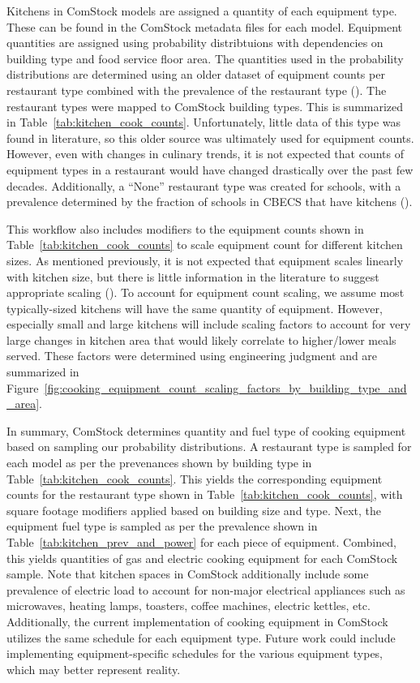 

Kitchens in ComStock models are assigned a quantity of each equipment type. These can be found in the ComStock metadata files for each model. Equipment quantities are assigned using probability distribtuions with dependencies on building type and food service floor area. The quantities used in the probability distributions are determined using an older dataset of equipment counts per restaurant type combined with the prevalence of the restaurant type (\cite{com_food_service_equip}). The restaurant types were mapped to ComStock building types. This is summarized in Table~\ref{tab:kitchen_cook_counts}. Unfortunately, little data of this type was found in literature, so this older source was ultimately used for equipment counts. However, even with changes in culinary trends, it is not expected that counts of equipment types in a restaurant would have changed drastically over the past few decades. Additionally, a “None” restaurant type was created for schools, with a prevalence determined by the fraction of schools in CBECS that have kitchens (\cite{eia2012cbecs}).

This workflow also includes modifiers to the equipment counts shown in Table~\ref{tab:kitchen_cook_counts} to scale equipment count for different kitchen sizes. As mentioned previously, it is not expected that equipment scales linearly with kitchen size, but there is little information in the literature to suggest appropriate scaling (\cite{qsr_50pct_svs}). To account for equipment count scaling, we assume most typically-sized kitchens will have the same quantity of equipment. However, especially small and large kitchens will include scaling factors to account for very large changes in kitchen area that would likely correlate to higher/lower meals served. These factors were determined using engineering judgment and are summarized in Figure~\ref{fig:cooking_equipment_count_scaling_factors_by_building_type_and_area}.

In summary, ComStock determines quantity and fuel type of cooking equipment based on sampling our probability distributions. A restaurant type is sampled for each model as per the prevenances shown by building type in Table~\ref{tab:kitchen_cook_counts}. This yields the corresponding equipment counts for the restaurant type shown in Table~\ref{tab:kitchen_cook_counts}, with square footage modifiers applied based on building size and type. Next, the equipment fuel type is sampled as per the prevalence shown in Table~\ref{tab:kitchen_prev_and_power} for each piece of equipment. Combined, this yields quantities of gas and electric cooking equipment for each ComStock sample. Note that kitchen spaces in ComStock additionally include some prevalence of electric load to account for non-major electrical appliances such as microwaves, heating lamps, toasters, coffee machines, electric kettles, etc. Additionally, the current implementation of cooking equipment in ComStock utilizes the same schedule for each equipment type. Future work could include implementing equipment-specific schedules for the various equipment types, which may better represent reality.


